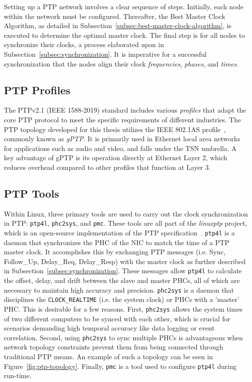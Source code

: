 Setting up a \ac{PTP} network involves a clear sequence of steps. Initially, each node within the network must be configured. Thereafter, the Best Master Clock Algorithm, as detailed in Subsection~\ref{subsec:best-master-clock-algorithm}, is executed to determine the optimal master clock. The final step is for all nodes to synchronize their clocks, a process elaborated upon in Subsection~\ref{subsec:synchronization}. It is imperative for a successful synchronization that the nodes align their clock \emph{frequencies}, \emph{phases}, and \emph{times}.

\subsection{PTP Profiles}
\label{subsec:ptp-profiles}
The PTPv2.1 (\ac{IEEE} 1588-2019) standard includes various \emph{profiles} that adapt the core \ac{PTP} protocol to meet the specific requirements of different industries. The \ac{PTP} topology developed for this thesis utilizes the \ac{IEEE} 802.1AS profile~\cite{4659212}, commonly known as \emph{\ac{gPTP}}. It is primarily used in Ethernet local area networks for applications such as audio and video, and falls under the \ac{TSN} umbrella. A key advantage of \ac{gPTP} is its operation directly at Ethernet Layer 2, which reduces overhead compared to other profiles that function at Layer 3.

\subsection{PTP Tools}
\label{subsec:ptp-tools}
Within Linux, three primary tools are used to carry out the clock synchronization in \ac{PTP}: \texttt{ptp4l}, \texttt{phc2sys}, and \texttt{pmc}. These tools are all part of the \emph{linuxptp} project, which is an open-source implementation of the \ac{PTP} specification~\cite{LinuxPTP}. \texttt{ptp4l} is a daemon that synchronizes the \ac{PHC} of the \ac{NIC} to match the time of a \ac{PTP} master clock. It accomplishes this by exchanging \ac{PTP} messages (i.e. Sync, Follow\_Up, Delay\_Req, Delay\_Resp) with the master clock as further described in Subsection~\ref{subsec:synchronization}. These messages allow \texttt{ptp4l} to calculate the offset, delay, and drift between the slave and master \ac{PHC}s, all of which are necessary to maintain high accuracy and precision. \texttt{phc2sys} is a daemon that disciplines the \texttt{CLOCK\_REALTIME} (i.e. the system clock) or \ac{PHC}s with a 'master' \ac{PHC}. This is desirable for a few reasons. First, \texttt{phc2sys} allows the system times of two different computers to be synced with each other, which is crucial for scenarios demanding high temporal accuracy like data logging or event correlation. Second, using \texttt{phc2sys} to sync multiple \ac{PHC}s is advantageous when network topology constraints prevent them from being connected through traditional \ac{PTP} means. An example of such a topology can be seen in Figure~\ref{fig:ptp-topology}. Finally, \texttt{pmc} is a tool used to configure \texttt{ptp4l} during run-time.

